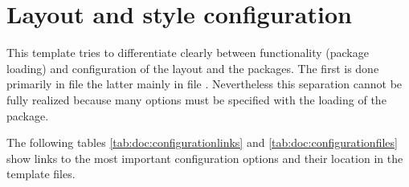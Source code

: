 
\section{Layout and style configuration}
\label{sec:doc:faq:style}

This template tries to differentiate clearly between functionality (package loading) and configuration of the layout and the packages. The first is done primarily in file  the latter mainly in file . Nevertheless this separation cannot be fully realized because many options must be specified with the loading of the package.

The following tables \ref{tab:doc:configurationlinks} and \ref{tab:doc:configurationfiles} show links to the most important configuration options and their location in the template files.


